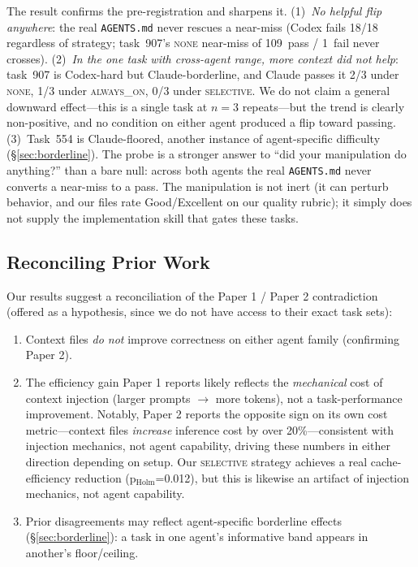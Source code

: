 \documentclass[11pt]{article}
\newcommand{\agentsmd}{\texttt{AGENTS.md}}
\newcommand{\none}{\textsc{none}}
\newcommand{\alwayson}{\textsc{always\_on}}
\newcommand{\selective}{\textsc{selective}}
\begin{document}
The result confirms the pre-registration and sharpens it.
(1)~\emph{No helpful flip anywhere}: the real \agentsmd{} never rescues a near-miss (Codex fails 18/18 regardless of strategy; task~907's \none{} near-miss of 109~pass / 1~fail never crosses).
(2)~\emph{In the one task with cross-agent range, more context did not help}: task~907 is Codex-hard but Claude-borderline, and Claude passes it 2/3 under \none{}, 1/3 under \alwayson{}, 0/3 under \selective{}. We do not claim a general downward effect---this is a single task at $n{=}3$ repeats---but the trend is clearly non-positive, and no condition on either agent produced a flip toward passing.
(3)~Task~554 is Claude-floored, another instance of agent-specific difficulty (\S\ref{sec:borderline}).
The probe is a stronger answer to ``did your manipulation do anything?'' than a bare null: across both agents the real \agentsmd{} never converts a near-miss to a pass.
The manipulation is not inert (it can perturb behavior, and our files rate Good/Excellent on our quality rubric); it simply does not supply the implementation skill that gates these tasks.

\subsection{Reconciling Prior Work}

Our results suggest a reconciliation of the Paper 1 / Paper 2 contradiction (offered as a hypothesis, since we do not have access to their exact task sets):
\begin{enumerate}
    \item Context files \emph{do not} improve correctness on either agent family (confirming Paper 2).
    \item The efficiency gain Paper 1 reports likely reflects the \emph{mechanical} cost of context injection (larger prompts $\to$ more tokens), not a task-performance improvement. Notably, Paper 2 reports the opposite sign on its own cost metric---context files \emph{increase} inference cost by over 20\%---consistent with injection mechanics, not agent capability, driving these numbers in either direction depending on setup. Our \selective{} strategy achieves a real cache-efficiency reduction (p$_\text{Holm}$=0.012), but this is likewise an artifact of injection mechanics, not agent capability.
    \item Prior disagreements may reflect agent-specific borderline effects (\S\ref{sec:borderline}): a task in one agent's informative band appears in another's floor/ceiling.
\end{enumerate}
\end{document}

